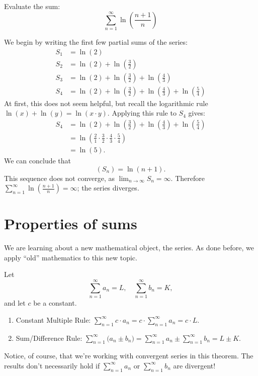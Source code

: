 \documentclass{ximera}
\begin{document}
\begin{example}
Evaluate the sum:
\[
\sum_{n=1}^\infty \ln\left(\frac{n+1}{n}\right)
\]
\begin{explanation}
We begin by writing the first few partial sums of the series:
\begin{align*}
S_1 &= \ln\left(2\right) \\
S_2 &= \ln\left(2\right)+\ln\left(\frac32\right) \\
S_3 &= \ln\left(2\right)+\ln\left(\frac32\right)+\ln\left(\frac43\right) \\
S_4 &= \ln\left(2\right)+\ln\left(\frac32\right)+\ln\left(\frac43\right)+\ln\left(\frac54\right) 
\end{align*}
At first, this does not seem helpful, but recall the logarithmic rule
$\ln(x)+\ln(y) = \ln (x\cdot y)$. Applying this rule to $S_4$ gives:
\begin{align*}
S_4 &= \ln\left(2\right)+\ln\left(\frac32\right)+\ln\left(\frac43\right)+\ln\left(\frac54\right) \\
&= \ln\left(\frac21\cdot\frac32\cdot\frac43\cdot\frac54\right)\\
&= \ln\left(5\right).
\end{align*}
We can conclude that
\[
(S_n) =\ln (n+1).
\]
This sequence does not converge, as
$\lim_{n\to\infty}S_n=\infty$. Therefore $\sum_{n=1}^\infty
\ln\left(\frac{n+1}{n}\right)=\infty$; the series diverges.
\end{explanation}
\end{example}


\section{Properties of sums}

We are learning about a new mathematical object, the series. As done
before, we apply ``old'' mathematics to this new topic.

\begin{theorem}
  Let
  \[
  \sum_{n=1}^\infty a_n = L,\quad \sum_{n=1}^\infty b_n =K, 
  \]
  and let $c$ be a constant.
\begin{enumerate}
\item Constant Multiple Rule: $\sum_{n=1}^\infty c\cdot a_n =
  c\cdot\sum_{n=1}^\infty a_n = c\cdot L.$
\item Sum/Difference Rule: $\sum_{n=1}^\infty \big(a_n\pm b_n\big) =
  \sum_{n=1}^\infty a_n \pm \sum_{n=1}^\infty b_n = L \pm K.$
\end{enumerate} 
\end{theorem}

Notice, of course, that we're working with convergent series in this 
theorem.  The results don't necessarily hold if $\sum_{n=1}^\infty a_n$ 
or $\sum_{n=1}^\infty b_n$ are divergent!
\end{document}

